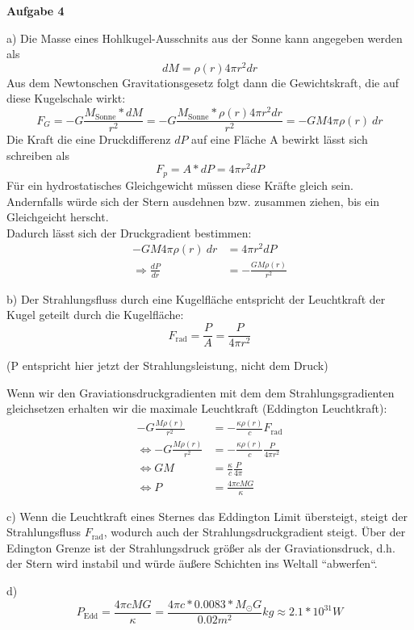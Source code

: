\documentclass[11pt, a4paper]{article}
\begin{document}
\thispagestyle{fancy}
{\large\textbf{Aufgabe 4}}
\par{a)}
Die Masse eines Hohlkugel-Ausschnits aus der Sonne kann angegeben werden als
\[
	dM = \rho(r) 4\pi r^2 dr
\]
Aus dem Newtonschen Gravitationsgesetz folgt dann die Gewichtskraft, die
auf diese Kugelschale wirkt:
\[
	F_G = -G \frac{M_{\text{Sonne}} * dM}{r^2} 
	= -G \frac{M_{\text{Sonne}} * \rho(r) 4\pi r^2 dr}{r^2}
	= -GM 4\pi \rho(r) \ dr
\]
Die Kraft die eine Druckdifferenz $dP$ auf eine Fläche A bewirkt lässt sich 
schreiben als
\[
	F_p = A * dP = 4\pi r^2 dP
\]
Für ein hydrostatisches Gleichgewicht müssen diese Kräfte gleich sein.
Andernfalls würde sich der Stern ausdehnen bzw. zusammen ziehen, bis ein 
Gleichgeicht herscht.\\
Dadurch lässt sich der Druckgradient bestimmen:
\begin{align*}
	-GM 4\pi \rho(r) \ dr
	&= 4\pi r^2 dP \\
	\Rightarrow
	\frac{dP}{dr} &= -\frac{GM \rho(r)}{r^2}
\end{align*}

\vspace{0.5cm}
\par{b)}
Der Strahlungsfluss durch eine Kugelfläche entspricht der Leuchtkraft 
der Kugel geteilt durch die Kugelfläche:
\[
	F_{\text{rad}} = \frac{P}{A} = \frac{P}{4\pi r^2}
\]
\begin{center}
	{\footnotesize{(P entspricht hier jetzt  der Strahlungsleistung, 
	nicht dem Druck)}}
\end{center}
Wenn wir den Graviationsdruckgradienten mit dem dem Strahlungsgradienten 
gleichsetzen
erhalten wir die maximale Leuchtkraft (Eddington Leuchtkraft):
\begin{align*}
	-G \frac{M\rho(r)}{r^2} 
	&= -\frac{\kappa\rho(r)}{c} F_{\text{rad}} \\
	\Leftrightarrow
	-G \frac{M\rho(r)}{r^2} 
	&= -\frac{\kappa\rho(r)}{c} \frac{P}{4\pi r^2} \\
	\Leftrightarrow
	GM
	&= \frac{\kappa}{c} \frac{P}{4\pi} \\
	\Leftrightarrow
	P
	&= \frac{4\pi c M G}{\kappa}
\end{align*}

\vspace{0.5cm}
\par{c)}
Wenn die Leuchtkraft eines Sternes das Eddington Limit übersteigt, steigt 
der Strahlungsfluss $F_\text{rad}$, wodurch auch der Strahlungsdruckgradient
steigt. Über der Edington Grenze ist der Strahlungsdruck größer als der
Graviationsdruck, d.h. der Stern wird instabil und würde äußere Schichten 
ins Weltall ``abwerfen``.

\vspace{0.5cm}
\par{d)}
\[
	P_\text{Edd} = \frac{4\pi c MG}{\kappa} 
	= \frac{4\pi c  * 0.0083 * M_\odot G}{0.02m^2}kg
	\approx 2.1 * 10^{31} W
\]
\end{document}
